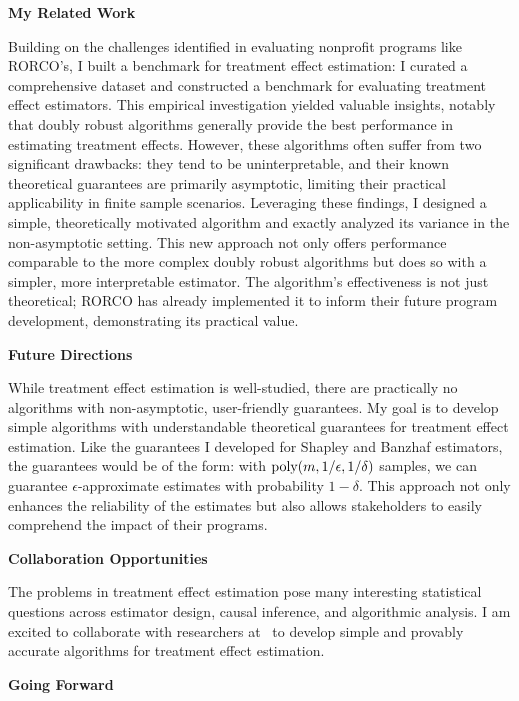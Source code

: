 \documentclass[11pt]{article}
\begin{document}
{{ \large \textbf{My Related Work}}

Building on the challenges identified in evaluating nonprofit programs like RORCO's, I built a benchmark for treatment effect estimation: I curated a comprehensive dataset and constructed a benchmark for evaluating treatment effect estimators. This empirical investigation yielded valuable insights, notably that doubly robust algorithms generally provide the best performance in estimating treatment effects. However, these algorithms often suffer from two significant drawbacks: they tend to be uninterpretable, and their known theoretical guarantees are primarily asymptotic, limiting their practical applicability in finite sample scenarios.
Leveraging these findings, I designed a simple, theoretically motivated algorithm and exactly analyzed its variance in the non-asymptotic setting. This new approach not only offers performance comparable to the more complex doubly robust algorithms but does so with a simpler, more interpretable estimator. The algorithm's effectiveness is not just theoretical; RORCO has already implemented it to inform their future program development, demonstrating its practical value.

{ \large \textbf{Future Directions}}

While treatment effect estimation is well-studied, there are practically no algorithms with non-asymptotic, user-friendly guarantees.
My goal is to develop simple algorithms with understandable theoretical guarantees for treatment effect estimation.
Like the guarantees I developed for Shapley and Banzhaf estimators, the guarantees would be of the form: with $\textnormal{poly}(m, 1/\epsilon, 1/\delta)$ samples, we can guarantee $\epsilon$-approximate estimates with probability $1-\delta$.
This approach not only enhances the reliability of the estimates but also allows stakeholders to easily comprehend the impact of their programs.

{ \large \textbf{Collaboration Opportunities}}

The problems in treatment effect estimation pose many interesting statistical questions across estimator design, causal inference, and algorithmic analysis. I am excited to collaborate with researchers at \school~to develop simple and provably accurate algorithms for treatment effect estimation.

\begin{center}
{ \large \textbf{Going Forward}}
\end{center}

}
\end{document}
